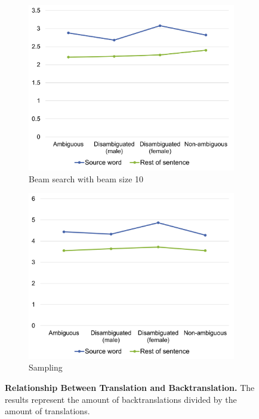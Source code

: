 \begin{figure}[!htb]
     \centering
     
     \begin{subfigure}{0.49\textwidth}
         \centering
         \includegraphics[width=\textwidth]{figures/correlation/translation_beam10.png}
         \caption{Beam search with beam size 10}
         \label{fig:correlation_translation_10}
     \end{subfigure}
     \hfill
     \begin{subfigure}{0.49\textwidth}
         \centering
         \includegraphics[width=\textwidth]{figures/correlation/translation_sampling.png}
         \caption{Sampling}
         \label{fig:correlation_translation_sampling}
     \end{subfigure}
     
    \caption[Relationship Between Translation and Backtranslation]{\textbf{Relationship Between Translation and Backtranslation.} The results represent the amount of backtranslations divided by the amount of translations.}
    \label{fig:correlation_translation}

\end{figure}


